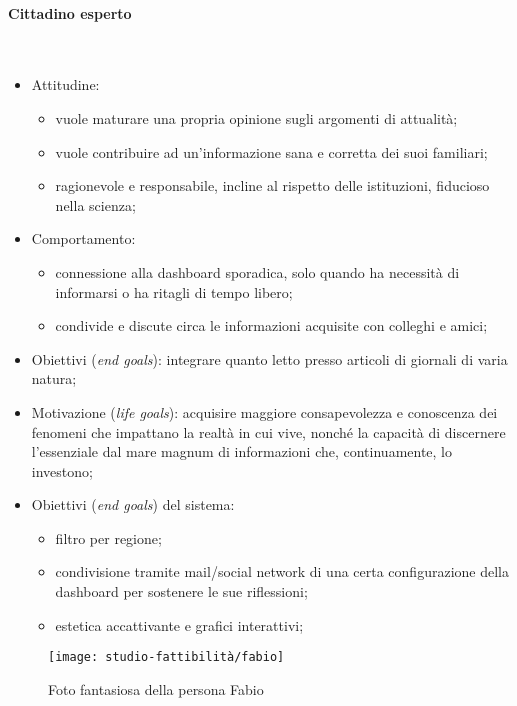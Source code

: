 \paragraph{Cittadino esperto}\mbox{}\\
	\begin{itemize}
	\item Attitudine:
    \begin{itemize}
        \item vuole maturare una propria opinione sugli argomenti di attualità;
        \item vuole contribuire ad un'informazione sana e corretta dei suoi familiari;
        \item ragionevole e responsabile, incline al rispetto delle istituzioni, fiducioso nella scienza;
    \end{itemize}
	\item Comportamento: 
    \begin{itemize}
        \item connessione alla dashboard sporadica, solo quando ha necessità di informarsi o ha ritagli di tempo libero;
        \item condivide e discute circa le informazioni acquisite con colleghi e amici;
    \end{itemize}
    \item Obiettivi (\textit{end goals}): integrare quanto letto presso articoli di giornali di varia natura;
    \item Motivazione (\textit{life goals}): acquisire maggiore consapevolezza e conoscenza dei fenomeni che impattano la realtà in cui vive, nonché la capacità di discernere l'essenziale dal mare magnum di informazioni che, continuamente, lo investono;
    \item Obiettivi (\textit{end goals}) del sistema:
    \begin{itemize}
        \item filtro per regione;
        \item condivisione tramite mail/social network di una certa configurazione della dashboard per sostenere le sue riflessioni;
        \item estetica accattivante e grafici interattivi;
    \end{itemize}
\end{itemize}

\begin{wrapfigure}{r}{8cm}
    \texttt{[image: studio-fattibilità/fabio]}
    \caption{Foto fantasiosa della persona Fabio}
\end{wrapfigure}

